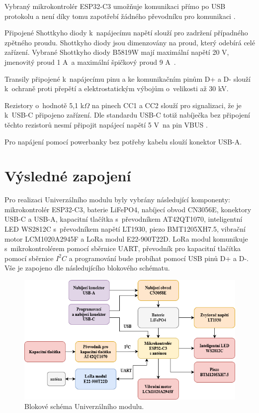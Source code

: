 Vybraný mikrokontrolér ESP32-C3 umožňuje komunikaci přímo po USB protokolu a není díky tomu zapotřebí žádného převodníku pro komunikaci \cite{ESP_C3_dtsh}.

Připojené Shottkyho diody k~napájecímu napětí slouží pro zadržení případného zpětného proudu. Shottkyho diody jsou dimenzovány na proud, který odebírá celé zařízení. Vybrané 
Shottkyho diody  B5819W mají maximální napětí 20 V, jmenovitý proud 1 A~a maximální špičkový proud 9 A~\cite{shotky_dtsh}.

Transily připojené k~napájecímu pinu a ke komunikačním pinům D+ a D- slouží k~ochraně proti přepětí a elektrostatickým výbojům o~velikosti až 30 kV. 

Rezistory o~hodnotě 5,1 k$\Omega$ na pinech CC1 a CC2 slouží pro signalizaci, že je k~USB-C připojeno zařízení. Dle standardu USB-C totiž nabíječka bez 
připojení těchto rezistorů nesmí připojit napájecí napětí 5 V~na pin VBUS \cite{USB-C}. 

Pro napájení pomocí powerbanky bez potřeby kabelu slouží konektor USB-A. 

\newpage
\section{Výsledné zapojení}
Pro realizaci Univerzálního modulu byly vybrány následující komponenty: mikrokontrolér ESP32-C3, baterie LiFePO4, nabíjecí obvod CN3056E, konektory USB-C a USB-A,
kapacitní tlačítka s~převodníkem AT42QT1070, inteligentní LED WS2812C s~převodníkem napětí LT1930, piezo BMT1205XH7.5, vibrační motor LCM1020A2945F a LoRa modul 
E22-900T22D. LoRa modul komunikuje 
s~mikrokontrolérem pomocí sběrnice UART, převodník pro kapacitní tlačítka pomocí sběrnice $I^2C$ a programování bude probíhat pomocí USB pinů D+ a D-. Vše je 
zapojeno dle následujícího blokového schématu. 

\begin{figure}[!h]
  \begin{center}
    \includegraphics[scale=0.65]{obrazky/vysledne_blokove_schema.png}
  \end{center}
  \caption[Blokové schéma Univerzálního modulu]{Blokové schéma Univerzálního modulu.}
\end{figure}


